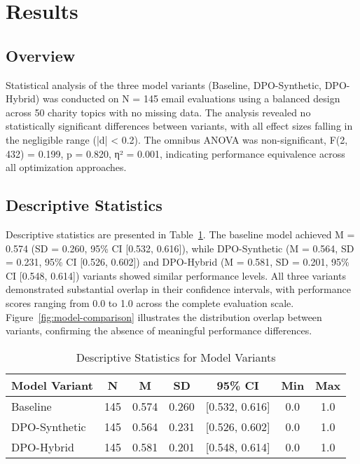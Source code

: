 
\section{Results}

\subsection{Overview}

Statistical analysis of the three model variants (Baseline, DPO-Synthetic, DPO-Hybrid) was conducted on N = 145 email evaluations using a balanced design across 50 charity topics with no missing data. The analysis revealed no statistically significant differences between variants, with all effect sizes falling in the negligible range (|d| < 0.2). The omnibus ANOVA was non-significant, F(2, 432) = 0.199, p = 0.820, η² = 0.001, indicating performance equivalence across all optimization approaches.

\subsection{Descriptive Statistics}

Descriptive statistics are presented in Table~\ref{tab:descriptive-statistics}. The baseline model achieved M = 0.574 (SD = 0.260, 95\% CI [0.532, 0.616]), while DPO-Synthetic (M = 0.564, SD = 0.231, 95\% CI [0.526, 0.602]) and DPO-Hybrid (M = 0.581, SD = 0.201, 95\% CI [0.548, 0.614]) variants showed similar performance levels. All three variants demonstrated substantial overlap in their confidence intervals, with performance scores ranging from 0.0 to 1.0 across the complete evaluation scale. Figure~\ref{fig:model-comparison} illustrates the distribution overlap between variants, confirming the absence of meaningful performance differences.

\begin{table}[htbp]
\centering
\caption{Descriptive Statistics for Model Variants}
\label{tab:descriptive-statistics}
\begin{tabular}{lcccccc}
\toprule
\textbf{Model Variant} & \textbf{N} & \textbf{M} & \textbf{SD} & \textbf{95\% CI} & \textbf{Min} & \textbf{Max} \\
\midrule
Baseline           & 145 & 0.574 & 0.260 & [0.532, 0.616] & 0.0 & 1.0 \\
DPO-Synthetic      & 145 & 0.564 & 0.231 & [0.526, 0.602] & 0.0 & 1.0 \\
DPO-Hybrid         & 145 & 0.581 & 0.201 & [0.548, 0.614] & 0.0 & 1.0 \\
\bottomrule
\end{tabular}
\end{table}

